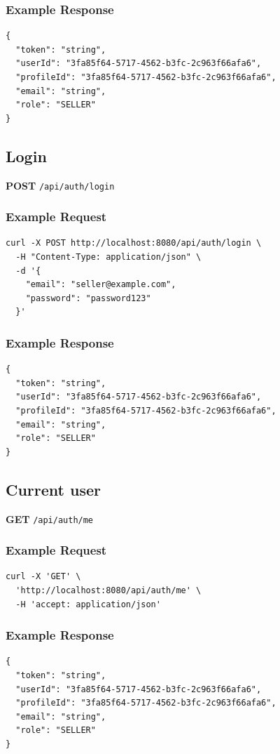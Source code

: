 \documentclass[a4paper,11pt]{article}
\begin{document}
\subsubsection*{Example Response}
\begin{lstlisting}
{
  "token": "string",
  "userId": "3fa85f64-5717-4562-b3fc-2c963f66afa6",
  "profileId": "3fa85f64-5717-4562-b3fc-2c963f66afa6",
  "email": "string",
  "role": "SELLER"
}
\end{lstlisting}

\subsection {Login}
\textbf{POST} \texttt{/api/auth/login}
\subsubsection*{Example Request}
\begin{lstlisting}
curl -X POST http://localhost:8080/api/auth/login \
  -H "Content-Type: application/json" \
  -d '{
    "email": "seller@example.com",
    "password": "password123"
  }'
\end{lstlisting}

\subsubsection*{Example Response}
\begin{lstlisting}
{
  "token": "string",
  "userId": "3fa85f64-5717-4562-b3fc-2c963f66afa6",
  "profileId": "3fa85f64-5717-4562-b3fc-2c963f66afa6",
  "email": "string",
  "role": "SELLER"
}
\end{lstlisting}


\subsection{Current user}
\textbf{GET} \texttt{/api/auth/me}
\subsubsection*{Example Request}
\begin{lstlisting}
curl -X 'GET' \
  'http://localhost:8080/api/auth/me' \
  -H 'accept: application/json'
\end{lstlisting}

\subsubsection*{Example Response}
\begin{lstlisting}
{
  "token": "string",
  "userId": "3fa85f64-5717-4562-b3fc-2c963f66afa6",
  "profileId": "3fa85f64-5717-4562-b3fc-2c963f66afa6",
  "email": "string",
  "role": "SELLER"
}
\end{lstlisting}
\end{document}

